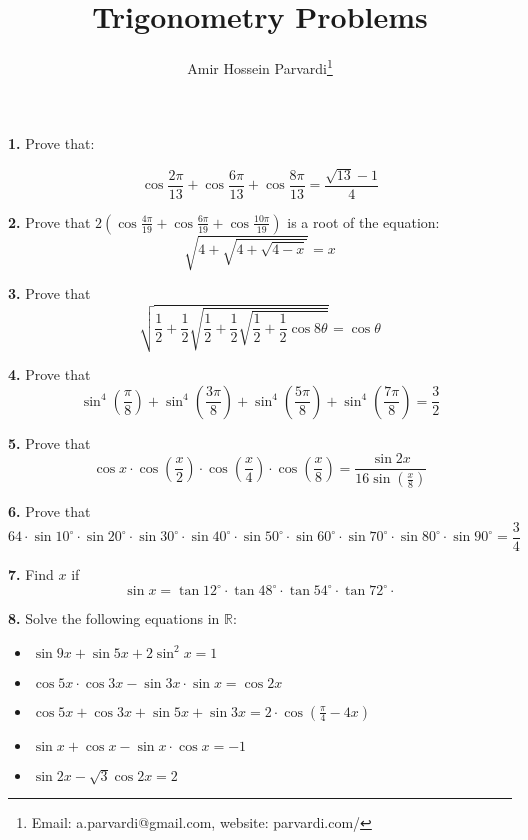 \documentclass{article}
\begin{document}
\title{Trigonometry Problems}\author{Amir Hossein Parvardi\thanks{ Email: a.parvardi@gmail.com, website: parvardi.com/ }} \maketitle

\doublespacing

\noindent 
{\bf 1.} Prove that:

\[\cos\frac{2\pi}{13}+\cos\frac{6\pi}{13}+\cos\frac{8\pi}{13}=\frac{\sqrt{13}-1}{4}\]

\noindent
{\bf 2.} Prove that $2\left(\cos\frac{4\pi}{19}+\cos\frac{6\pi}{19}+\cos\frac{10\pi}{19}\right)$ is a root of the equation:
\[\sqrt{4+\sqrt{4+\sqrt{4-x}}}=x\]

\noindent
{\bf 3.} Prove that
\[\sqrt{\frac12+\frac12 \sqrt{\frac12+\frac12 \sqrt{\frac12+\frac12 \cos 8\theta}}}=\cos \theta\]

\noindent
{\bf 4.} Prove that
\[ \sin^4 \left(\frac{\pi}{8}\right)+\sin^4 \left(\frac{3\pi}{8}\right)+\sin^4 \left(\frac{5\pi}{8}\right)+\sin^4 \left(\frac{7\pi}{8}\right)=\frac32\]


\noindent
{\bf 5.} Prove that
\[\cos x \cdot \cos \left(\frac{x}{2}\right) \cdot \cos \left(\frac{x}{4}\right) \cdot \cos \left(\frac{x}{8}\right)= \dfrac{\sin 2x}{16 \sin \left(\frac{x}{8}\right)}\]

\singlespacing
\noindent
{\bf 6.} Prove that
\[64 \cdot \sin 10^{\circ}\cdot \sin 20^{\circ}\cdot \sin 30^{\circ}\cdot \sin 40^{\circ}\cdot \sin 50^{\circ}\cdot \sin 60^{\circ}\cdot \sin 70^{\circ}\cdot \sin 80^{\circ}\cdot \sin 90^{\circ}=\dfrac34\]

\doublespacing
\noindent
{\bf 7.} Find $x$ if
\[\sin x= \tan12^{\circ}\cdot \tan48^{\circ}\cdot \tan54^{\circ} \cdot \tan72^{\circ}\cdot\]

\noindent
{\bf 8.} Solve the following equations in $\mathbb R$:
\begin{itemize}

\item $\sin 9x+ \sin 5x + 2\sin^2 x=1$

\item $\cos 5x \cdot \cos 3x - \sin 3x \cdot \sin x = \cos 2x$

\item $\cos 5x+\cos 3x+\sin 5x+\sin 3x=2 \cdot \cos\left(\frac{\pi}4 - 4x\right)$

\item $\sin x + \cos x -\sin x \cdot \cos x= -1$

\item $\sin 2x - \sqrt 3 \cos 2x = 2$


\end{itemize}
\end{document}
